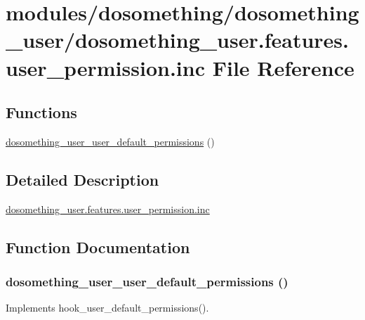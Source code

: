\hypertarget{dosomething__user_8features_8user__permission_8inc}{
\section{modules/dosomething/dosomething\_\-user/dosomething\_\-user.features.user\_\-permission.inc File Reference}
\label{dosomething__user_8features_8user__permission_8inc}
}
\subsection*{Functions}
\begin{DoxyCompactItemize}
\item 
\hyperlink{dosomething__user_8features_8user__permission_8inc_adad24a934aacd92286faef23ae894586}{dosomething\_\-user\_\-user\_\-default\_\-permissions} ()
\end{DoxyCompactItemize}


\subsection{Detailed Description}
\hyperlink{dosomething__user_8features_8user__permission_8inc}{dosomething\_\-user.features.user\_\-permission.inc} 

\subsection{Function Documentation}
\hypertarget{dosomething__user_8features_8user__permission_8inc_adad24a934aacd92286faef23ae894586}{
\subsubsection[{dosomething\_\-user\_\-user\_\-default\_\-permissions}]{\setlength{\rightskip}{0pt plus 5cm}dosomething\_\-user\_\-user\_\-default\_\-permissions ()}}
\label{dosomething__user_8features_8user__permission_8inc_adad24a934aacd92286faef23ae894586}
Implements hook\_\-user\_\-default\_\-permissions(). 